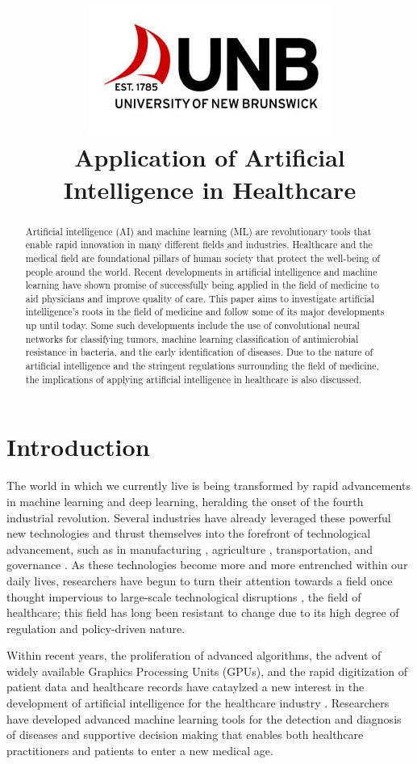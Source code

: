 \documentclass[a4paper]{article}
\title{\includegraphics[scale=0.75]{Resources/unblogo.jpg}\\Application of Artificial Intelligence in Healthcare}
\begin{document}
\maketitle

\begin{abstract}
    Artificial intelligence (AI) and machine learning (ML) are revolutionary tools that enable rapid innovation in many different fields and industries. Healthcare and the medical field are foundational pillars of human society that protect the well-being of people around the world. Recent developments in artificial intelligence and machine learning have shown promise of successfully being applied in the field of medicine to aid physicians and improve quality of care. This paper aims to investigate artificial intelligence's roots in the field of medicine and follow some of its major developments up until today. Some such developments include the use of convolutional neural networks for classifying tumors, machine learning classification of antimicrobial resistance in bacteria, and the early identification of diseases. Due to the nature of artificial intelligence and the stringent regulations surrounding the field of medicine, the implications of applying artificial intelligence in healthcare is also discussed.   
\end{abstract}

\newpage

\section{Introduction}

The world in which we currently live is being transformed by rapid advancements in machine learning and deep learning, heralding the onset of the fourth industrial revolution. Several industries have already leveraged these powerful new technologies and thrust themselves into the forefront of technological advancement, such as in manufacturing \cite{mohd_2022}, agriculture \cite{rashid_2024}, transportation, and governance \cite{qayyum_2021}. As these technologies become more and more entrenched within our daily lives, researchers have begun to turn their attention towards a field once thought impervious to large-scale technological disruptions \cite{qayyum_2021, latif_2017}, the field of healthcare; this field has long been resistant to change due to its high degree of regulation and policy-driven nature.

Within recent years, the proliferation of advanced algorithms, the advent of widely available Graphics Processing Units (GPUs), and the rapid digitization of patient data and healthcare records have cataylzed a new interest in the development of artificial intelligence for the healthcare industry \cite{jones_2018}. Researchers have developed advanced machine learning tools for the detection and diagnosis of diseases and supportive decision making that enables both healthcare practitioners and patients to enter a new medical age. \
\end{document}
